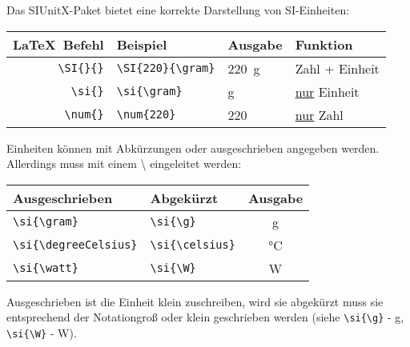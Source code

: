 \documentclass["WS\space 16-17\space -\space LaTeX-Kurs\space -\space Praesentation\space -\space 3.tex"]{subfiles}
\begin{document}
\begin{frame}[fragile]
		Das SIUnitX-Paket bietet eine korrekte Darstellung von SI-Einheiten:
	\begin{center}
	\begin{tabular}{r|ll|l}
		\toprule
		\LaTeX\ Befehl					& Beispiel		&Ausgabe	&	Funktion								\\ \midrule
		\lstinline|\SI{}{}|			&	\lstinline|\SI{220}{\gram}| & \SI{220}{\gram}			&	Zahl + Einheit				\\
		\lstinline/\si{}/			&	\lstinline|\si{\gram}|	& \si{\gram}				&	\underline{nur} Einheit					\\
			\lstinline/\num{}/			&	\lstinline|\num{220}|& \num{220}					&	\underline{nur} Zahl					\\
		\bottomrule
	\end{tabular}
\end{center}
Einheiten können mit Abkürzungen oder ausgeschrieben angegeben werden. Allerdings muss mit einem {\textbackslash} eingeleitet werden:
	\begin{center}
	\begin{tabular}{ll|c}
	\toprule
	Ausgeschrieben						& Abgekürzt						& Ausgabe				\\ \midrule
	\lstinline/\si{\gram}/				&	\lstinline|\si{\g}|			& \si{\gram}			\\
	\lstinline/\si{\degreeCelsius}/		&	\lstinline|\si{\celsius}|	& \si{\celsius}		\\
	\lstinline/\si{\watt}/				&	\lstinline|\si{\W}|			& \si{\W}			\\
	\bottomrule
\end{tabular}
\end{center}
Ausgeschrieben ist die Einheit klein zuschreiben, wird sie abgekürzt muss sie entsprechend der Notationgroß oder klein geschrieben werden (siehe \lstinline|\si{\g}| - \si{\g}, \lstinline|\si{\W}| - \si{\W}).
\end{frame}
\end{document}
